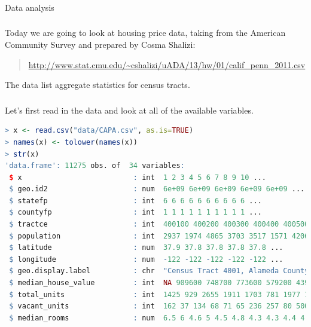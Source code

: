\documentclass[xetex,mathserif,serif,aspectratio=169]{beamer}
\begin{document}
\begin{frame}[fragile] \frametitle{} \oldB \small

\begin{flushright}
{\color{yaleblue}\sc\fontsize{1cm}{0cm}\selectfont Data analysis}
\end{flushright}

\end{frame}


\begin{frame}[fragile] \frametitle{} \oldB \small

\textbf{}

Today we are going to look at housing price data, taking from
the American Community Survey and prepared by Cosma Shalizi:
\begin{quote}
\url{http://www.stat.cmu.edu/~cshalizi/uADA/13/hw/01/calif_penn_2011.csv}
\end{quote}
The data list aggregate statistics for census tracts.

\end{frame}

\begin{frame}[fragile] \frametitle{} \oldB \small

Let's first read in the data and look at all of the available
variables.
\begin{lstlisting}[language=R, basicstyle=\fontsize{8pt}{10pt}\selectfont\ttfamily]
> x <- read.csv("data/CAPA.csv", as.is=TRUE)
> names(x) <- tolower(names(x))
> str(x)
'data.frame': 11275 obs. of  34 variables:
 $ x                          : int  1 2 3 4 5 6 7 8 9 10 ...
 $ geo.id2                    : num  6e+09 6e+09 6e+09 6e+09 6e+09 ...
 $ statefp                    : int  6 6 6 6 6 6 6 6 6 6 ...
 $ countyfp                   : int  1 1 1 1 1 1 1 1 1 1 ...
 $ tractce                    : int  400100 400200 400300 400400 400500 ..
 $ population                 : int  2937 1974 4865 3703 3517 1571 4206 3594 2302 5678 ...
 $ latitude                   : num  37.9 37.8 37.8 37.8 37.8 ...
 $ longitude                  : num  -122 -122 -122 -122 -122 ...
 $ geo.display.label          : chr  "Census Tract 4001, Alameda County, California" ...
 $ median_house_value         : int  NA 909600 748700 773600 579200 439300 369800 ...
 $ total_units                : int  1425 929 2655 1911 1703 781 1977 1738 1202 2665 ...
 $ vacant_units               : int  162 37 134 68 71 65 236 257 80 500 ...
 $ median_rooms               : num  6.5 6 4.6 5 4.5 4.8 4.3 4.3 4.4 4.6 ...
\end{lstlisting}

\end{frame}
\end{document}
